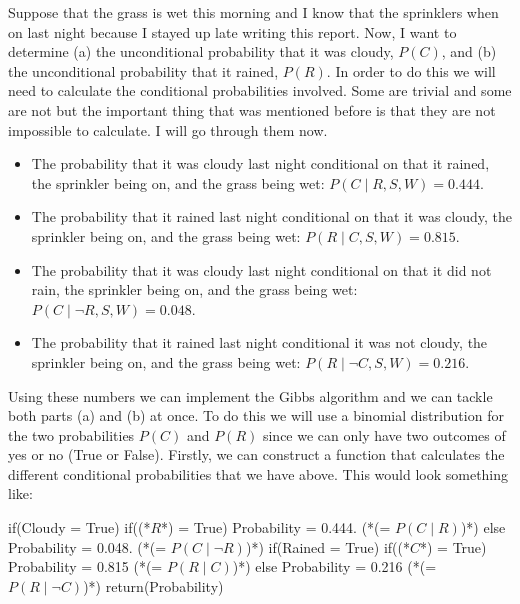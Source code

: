 \documentclass[12pt,twoside]{report}   %
\begin{document}
Suppose that the grass is wet this morning and I know that the sprinklers when on last night because I stayed up late writing this report. Now, I want to determine (a) the unconditional probability that it was cloudy, $P(C)$, and (b) the unconditional probability that it rained, $P(R)$. In order to do this we will need to calculate the conditional probabilities involved. Some are trivial and some are not but the important thing that was mentioned before is that they are not impossible to calculate. I will go through them now.
\begin{itemize}
\item The probability that it was cloudy last night conditional on that it rained, the sprinkler being on, and the grass being wet: $P(C\mid R,S,W) = 0.444$.
\item The probability that it rained last night conditional on that it was cloudy, the sprinkler being on, and the grass being wet: $P(R\mid C,S,W) = 0.815$.
\item The probability that it was cloudy last night conditional on that it did not rain, the sprinkler being on, and the grass being wet: $P(C\mid\lnot R,S,W) = 0.048$.
\item The probability that it rained last night conditional it was not cloudy, the sprinkler being on, and the grass being wet: $P(R\mid\lnot C,S,W) = 0.216$.
\end{itemize}
Using these numbers we can implement the Gibbs algorithm and we can tackle both parts (a) and (b) at once.  To do this we will use a binomial distribution for the two probabilities $P(C)$ and $P(R)$ since we can only have two outcomes of yes or no (True or False). Firstly, we can construct a function that calculates the different conditional probabilities that we have above. This would look something like:
\begin{Pseudocode}[caption={This function is working like a truth table where we have two variable Cloudy and Rained, and the 4 possible truth states. I used the slightly shorter notation, i.e. $P(C\mid R)$ rather than $P(C\mid R,S,W)$, because in this problem we know that the sprinklers went on and that the grass is wet. So for all four states listed above, $S$ and $W$ are always true so we can drop them out as long as we remember why.},language=R,escapeinside={(*}{*)},label={code1}]
if(Cloudy = True){
	if((*$R$*) = True){
		Probability = 0.444. (*(= $P(C\mid R)$)*)
	}
	else{
		Probability = 0.048. (*(= $P(C\mid\lnot R)$)*)
	}
}
if(Rained = True){
	if((*$C$*) = True){
		Probability = 0.815  (*(= $P(R\mid C)$)*)
	}
	else{
		Probability = 0.216 (*(= $P(R\mid\lnot C)$)*)
	}
}
return(Probability)
\end{Pseudocode}
\end{document}
